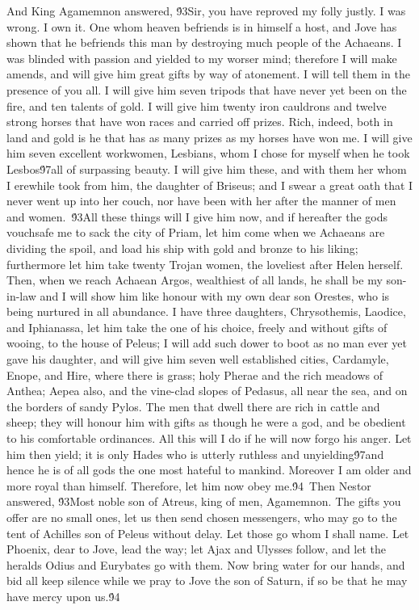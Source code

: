 {And King Agamemnon answered, \'93Sir, you have reproved my folly justly. I was wrong. I own it. One whom heaven befriends is in himself a host, and Jove has shown that he befriends this man by destroying much people of the Achaeans. I was blinded with passion and yielded to my worser mind; therefore I will make amends, and will give him great gifts by way of atonement. I will tell them in the presence of you all. I will give him seven tripods that have never yet been on the fire, and ten talents of gold. I will give him twenty iron cauldrons and twelve strong horses that have won races and carried off prizes. Rich, indeed, both in land and gold is he that has as many prizes as my horses have won me. I will give him seven excellent workwomen, Lesbians, whom I chose for myself when he took Lesbos\'97all of surpassing beauty. I will give him these, and with them her whom I erewhile took from him, the daughter of Briseus; and I swear a great oath that I never went up into her couch, nor have been with her after the manner of men and women.\
\'93All these things will I give him now, and if hereafter the gods vouchsafe me to sack the city of Priam, let him come when we Achaeans are dividing the spoil, and load his ship with gold and bronze to his liking; furthermore let him take twenty Trojan women, the loveliest after Helen herself. Then, when we reach Achaean Argos, wealthiest of all lands, he shall be my son-in-law and I will show him like honour with my own dear son Orestes, who is being nurtured in all abundance. I have three daughters, Chrysothemis, Laodice, and Iphianassa, let him take the one of his choice, freely and without gifts of wooing, to the house of Peleus; I will add such dower to boot as no man ever yet gave his daughter, and will give him seven well established cities, Cardamyle, Enope, and Hire, where there is grass; holy Pherae and the rich meadows of Anthea; Aepea also, and the vine-clad slopes of Pedasus, all near the sea, and on the borders of sandy Pylos. The men that dwell there are rich in cattle and sheep; they will honour him with gifts as though he were a god, and be obedient to his comfortable ordinances. All this will I do if he will now forgo his anger. Let him then yield; it is only Hades who is utterly ruthless and unyielding\'97and hence he is of all gods the one most hateful to mankind. Moreover I am older and more royal than himself. Therefore, let him now obey me.\'94\
Then Nestor answered, \'93Most noble son of Atreus, king of men, Agamemnon. The gifts you offer are no small ones, let us then send chosen messengers, who may go to the tent of Achilles son of Peleus without delay. Let those go whom I shall name. Let Phoenix, dear to Jove, lead the way; let Ajax and Ulysses follow, and let the heralds Odius and Eurybates go with them. Now bring water for our hands, and bid all keep silence while we pray to Jove the son of Saturn, if so be that he may have mercy upon us.\'94\
}
